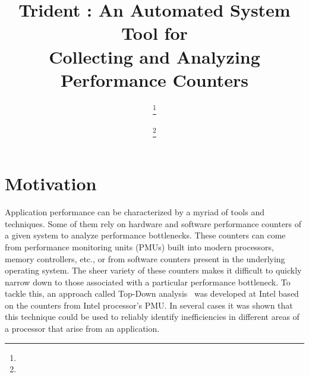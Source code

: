 \documentclass{webofc}
\begin{document}
\title{Trident : An Automated System Tool for \\Collecting and Analyzing Performance Counters}

\author{ \fnsep\thanks{} \and
         \fnsep\thanks{}
}


%
\maketitle
%
\section{Motivation}
\label{sec:moti}

Application performance can be characterized by a myriad of tools and techniques. Some of them rely on hardware and software performance counters of a given system to analyze performance bottlenecks. These counters can come from performance monitoring units (PMUs) built into modern processors, memory controllers, etc., or from software counters present in the underlying operating system. The sheer variety of these counters makes it difficult to quickly narrow down to those associated with a particular performance bottleneck. To tackle this, an approach called Top-Down analysis~\cite{6844459} was developed at Intel based on the counters from Intel processor's PMU. In several cases it was shown that this technique could be used to reliably identify inefficiencies in different areas of a processor that arise from an application.
\end{document}
